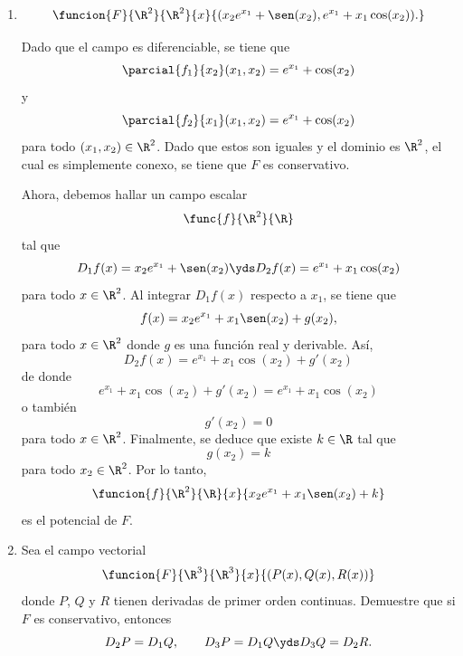 \documentclass[a4,11pt]{aleph-examen}
\begin{document}
\begin{preguntas}
\begin{respuesta}
\begin{respuesta}
\begin{respuesta}
\begin{enumerate}
	\item 
		\[
		    \funcion{F}{\R^2}{\R^2}{x}{(x_2e^{x_1}+\sen(x_2),e^{x_1}+x_1\cos(x_2)).}
		\]
	
\begin{respuesta}
    Dado que el campo es diferenciable, se tiene que 
	\[
	    \parcial{f_1}{x_2}(x_1,x_2) = e^{x_1} + \cos(x_2)
	\]
	y
	\[
	    \parcial{f_2}{x_1}(x_1,x_2) = e^{x_1} + \cos(x_2)
	\]
	para todo $(x_1,x_2)\in\R^2$. Dado que estos son iguales y el dominio es $\R^2$, el cual es simplemente conexo, se tiene que $F$ es conservativo.
	
	Ahora, debemos hallar un campo escalar
	\[
		\func{f}{\R^2}{\R}
	\]
	tal que
	\[
		D_1 f(x)=x_2e^{x_1}+\sen(x_2)
		\yds
		D_2 f(x)=e^{x_1}+x_1\cos(x_2)
	\]
	para todo $x\in\R^2$. Al integrar $D_1 f(x)$ respecto a $x_1$, se tiene que
	\[
		f(x)=x_2e^{x_1}+x_1\sen(x_2) + g(x_2),
	\]
	para todo $x\in\R^2$ donde $g$ es una función real y derivable. Así,
	\[
		D_2 f(x)= e^{x_1}+x_1\cos(x_2) + g'(x_2)
	\]
	de donde
	\[
		e^{x_1}+x_1\cos(x_2) + g'(x_2)=e^{x_1}+x_1\cos(x_2)
	\]
	o también
	\[
		g'(x_2)=0
	\]
	para todo $x\in\R^2$. Finalmente, se deduce que existe $k\in\R$ tal que
	\[
		g(x_2)=k
	\]
	para todo $x_2\in\R^2$. Por lo tanto,
	\[
		\funcion{f}{\R^2}{\R}{x}{x_2e^{x_1}+x_1\sen(x_2) + k}
	\]
    es el potencial de $F$.
\end{respuesta}



\item 
	Sea el campo vectorial
	\[
		\funcion{F}{\R^3}{\R^3}{x}{(P(x),Q(x),R(x))} 
	\]
	donde $P$, $Q$ y $R$ tienen derivadas de primer orden continuas. Demuestre que si $F$ es conservativo, entonces
	\[
		D_2 P =D_1 Q,\qquad D_3 P =D_1 Q \yds D_3 Q =D_2 R.
	\]




\end{enumerate}
\end{respuesta}
\end{respuesta}
\end{respuesta}
\end{preguntas}
\end{document}
